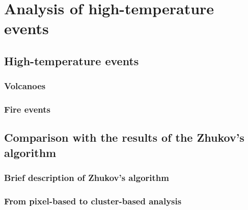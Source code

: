 \chapter{Analysis of high-temperature events}

\label{Chapter5}


\section{High-temperature events}


\subsection{Volcanoes}


\subsection{Fire events}


\section{Comparison with the results of the Zhukov's algorithm}


\subsection{Brief description of Zhukov's algorithm}


\subsection{From pixel-based to cluster-based analysis}

